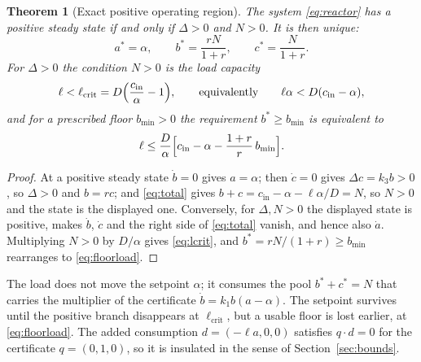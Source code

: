 \documentclass[11pt,a4paper]{article}
\theoremstyle{plain}
\newtheorem{theorem}{Theorem}[section]
\theoremstyle{definition}
\theoremstyle{remark}
\newcommand{\cin}{c_{\mathrm{in}}}
\begin{document}
\begin{theorem}[Exact positive operating region]\label{thm:reactor}
The system \eqref{eq:reactor} has a positive steady state if and only if $\Delta>0$ and $N>0$. It is then unique:
\[
  a^*=\alpha,\qquad b^*=\frac{rN}{1+r},\qquad c^*=\frac{N}{1+r}.
\]
For $\Delta>0$ the condition $N>0$ is the load capacity
\begin{equation}\label{eq:lcrit}
  \ell<\ell_{\mathrm{crit}}=D\Bigl(\frac{\cin}{\alpha}-1\Bigr),\qquad\text{equivalently}\qquad \ell\alpha<D(\cin-\alpha),
\end{equation}
and for a prescribed floor $b_{\min}>0$ the requirement $b^*\ge b_{\min}$ is equivalent to
\begin{equation}\label{eq:floorload}
  \ell\le\frac{D}{\alpha}\Bigl[\cin-\alpha-\frac{1+r}{r}\,b_{\min}\Bigr].
\end{equation}
\end{theorem}
\begin{proof}
At a positive steady state $\dot b=0$ gives $a=\alpha$; then $\dot c=0$ gives $\Delta c=k_3b>0$, so $\Delta>0$ and $b=rc$; and \eqref{eq:total} gives $b+c=\cin-\alpha-\ell\alpha/D=N$, so $N>0$ and the state is the displayed one. Conversely, for $\Delta,N>0$ the displayed state is positive, makes $\dot b$, $\dot c$ and the right side of \eqref{eq:total} vanish, and hence also $\dot a$. Multiplying $N>0$ by $D/\alpha$ gives \eqref{eq:lcrit}, and $b^*=rN/(1+r)\ge b_{\min}$ rearranges to \eqref{eq:floorload}.
\end{proof}

The load does not move the setpoint $\alpha$; it consumes the pool $b^*+c^*=N$ that carries the multiplier of the certificate $\dot b=k_1b(a-\alpha)$. The setpoint survives until the positive branch disappears at $\ell_{\mathrm{crit}}$, but a usable floor is lost earlier, at \eqref{eq:floorload}. The added consumption $d=(-\ell a,0,0)$ satisfies $q\cdot d=0$ for the certificate $q=(0,1,0)$, so it is insulated in the sense of Section~\ref{sec:bounds}.
\end{document}
